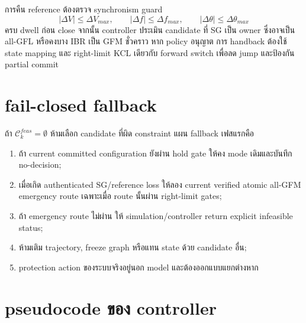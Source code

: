 \documentclass[12pt,a4paper]{article}
\begin{document}
การคืน reference ต้องตรวจ synchronism guard
\begin{equation}
|\Delta V|\le\Delta V_{max},\qquad
|\Delta f|\le\Delta f_{max},\qquad
|\Delta\theta|\le\Delta\theta_{max}
\end{equation}
ครบ dwell ก่อน close จากนั้น controller ประเมิน candidate ที่ SG เป็น owner ซึ่งอาจเป็น all-GFL
หรือคงบาง IBR เป็น GFM ชั่วคราว หาก policy อนุญาต การ handback ต้องใช้ state mapping และ right-limit
KCL เดียวกับ forward switch เพื่อลด jump และป้องกัน partial commit

\section{fail-closed fallback}

ถ้า $\mathcal C_k^{feas}=\emptyset$ ห้ามเลือก candidate ที่ผิด constraint แผน fallback เฟสแรกคือ
\begin{enumerate}
  \item ถ้า current committed configuration ยังผ่าน hold gate ให้คง mode เดิมและบันทึก no-decision;
  \item เมื่อเกิด authenticated SG/reference loss ให้ลอง current verified atomic all-GFM emergency route
  เฉพาะเมื่อ route นั้นผ่าน right-limit gates;
  \item ถ้า emergency route ไม่ผ่าน ให้ simulation/controller return explicit infeasible status;
  \item ห้ามเติม trajectory, freeze graph หรือแทน state ด้วย candidate อื่น;
  \item protection action ของระบบจริงอยู่นอก model และต้องออกแบบแยกต่างหาก
\end{enumerate}

\section{pseudocode ของ controller}
\end{document}
